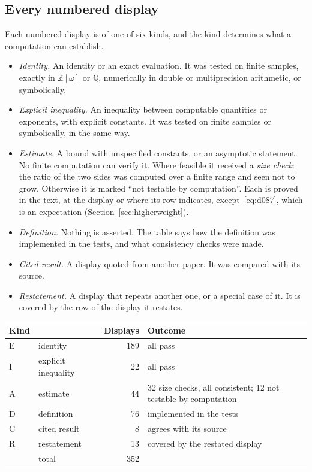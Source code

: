 \documentclass[11pt]{article}
\numberwithin{equation}{section}
\newcommand{\OO}{\mathbb Z[\omega]}
\begin{document}
\subsection{Every numbered display}\label{sec:numerics-displays}

Each numbered display is of one of six kinds, and the kind determines what a computation can establish.
\begin{itemize}
\item[E] \emph{Identity.} An identity or an exact evaluation. It was tested on finite samples, exactly in $\OO$ or
 $\mathbb Q$, numerically in double or multiprecision arithmetic, or symbolically.
\item[I] \emph{Explicit inequality.} An inequality between computable quantities or exponents, with explicit
 constants. It was tested on finite samples or symbolically, in the same way.
\item[A] \emph{Estimate.} A bound with unspecified constants, or an asymptotic statement. No finite computation can
 verify it. Where feasible it received a \emph{size check}: the ratio of the two sides was computed over a finite
 range and seen not to grow. Otherwise it is marked ``not testable by computation''. Each is proved in the text, at the display or where its
 row indicates, except~\eqref{eq:d087}, which is an expectation (Section~\ref{sec:higherweight}).
\item[D] \emph{Definition.} Nothing is asserted. The table says how the definition was implemented in the tests,
 and what consistency checks were made.
\item[C] \emph{Cited result.} A display quoted from another paper. It was compared with its source.
\item[R] \emph{Restatement.} A display that repeats another one, or a special case of it. It is covered by the
 row of the display it restates.
\end{itemize}

\begin{center}
\small
\begin{tabular}{@{}llrl@{}}
\toprule
Kind & & Displays & Outcome\\\midrule
E & identity & 189 & all pass\\
I & explicit inequality & 22 & all pass\\
A & estimate & 44 & 32 size checks, all consistent; 12 not testable by computation\\
D & definition & 76 & implemented in the tests\\
C & cited result & 8 & agrees with its source\\
R & restatement & 13 & covered by the restated display\\\midrule
 & total & 352 & \\\bottomrule
\end{tabular}
\end{center}
\end{document}
